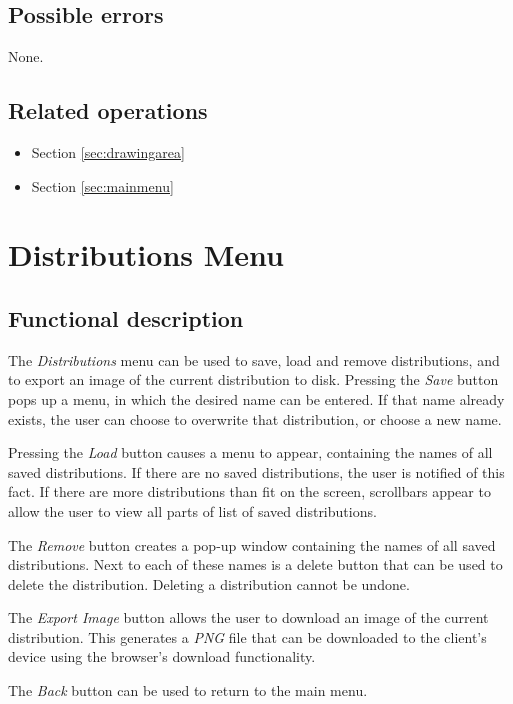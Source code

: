   \subsection*{Possible errors}
  None.

  \subsection*{Related operations}
  \begin{itemize}
  \item Section \ref{sec:drawingarea}
    \item Section \ref{sec:mainmenu}
  \end{itemize}

\section{Distributions Menu}\label{sec:distmenu}
  \subsection*{Functional description}
  The \emph{Distributions} menu can be used to save, load and remove distributions, and to export an image of the current distribution to disk. Pressing the \emph{Save} button pops up a menu, in which the desired name can be entered. If that name already exists, the user can choose to overwrite that distribution, or choose a new name.
  
  Pressing the \emph{Load} button causes a menu to appear, containing the names of all saved distributions. If there are no saved distributions, the user is notified of this fact. If there are more distributions than fit on the screen, scrollbars appear to allow the user to view all parts of list of saved distributions.
  
  The \emph{Remove} button creates a pop-up window containing the names of all saved distributions. Next to each of these names is a delete button that can be used to delete the distribution. Deleting a distribution cannot be undone. 
  
  The \emph{Export Image} button allows the user to download an image of the current distribution. This generates a \emph{PNG} file that can be downloaded to the client's device using the browser's download functionality.
  
  The \emph{Back} button can be used to return to the main menu.

